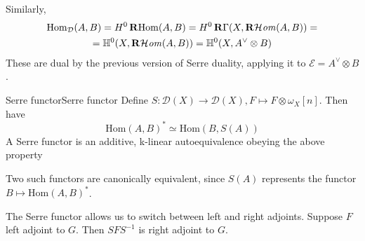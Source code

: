 Similarly, $$\begin{gathered}
\mathrm{Hom}_{\mathcal{D}}(A,B)=H^0\operatorname{\mathbf{R}Hom}(A,B)=H^0 \operatorname{\mathbf{R}\Gamma}(X,\operatorname{\mathbf{R}\mathcal{H}\mathit{om}}(A,B))=\\=\mathbb{H}^0(X,\operatorname{\mathbf{R}\mathcal{H}\mathit{om}}(A,B))=\mathbb{H}^0(X, A^\lor\otimes B)
\end{gathered}$$
These are dual by the previous version of Serre duality, applying it to $\mathcal{E}=A^\lor \otimes B$. 

\begin{definition}{Serre functor}{Serre functor}
    Define $S:\mathcal{D}(X)\rightarrow \mathcal{D}(X), F\mapsto F\otimes \omega_{X}[n]$. Then have $$\mathrm{Hom}(A,B)^*\simeq \mathrm{Hom}(B,S(A))$$
     A Serre functor is an additive, k-linear autoequivalence obeying the above property
\end{definition}

Two such functors are canonically equivalent, since $S(A)$ represents the functor $B\mapsto \mathrm{Hom}(A,B)^*$. 




The Serre functor allows us to switch between left and right adjoints. Suppose $F$ left adjoint to $G$. Then $SFS^{-1}$ is right adjoint to $G$. 


